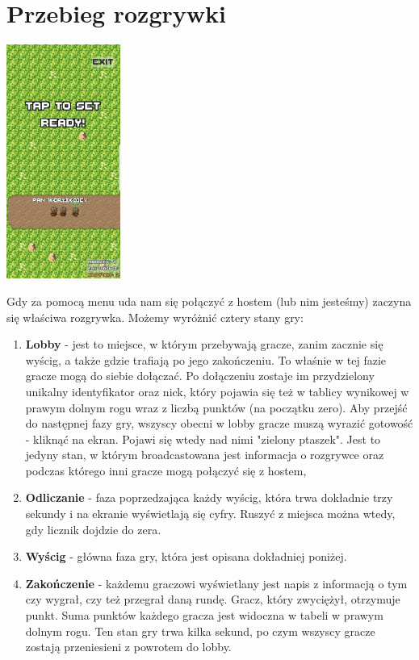 \documentclass[]{report}
\begin{document}
\chapter*{Przebieg rozgrywki}
\begin{center}
	\includegraphics[width=0.28\textwidth]{g3.jpg}
\end{center}
\bigskip
\quad Gdy za pomocą menu uda nam się połączyć z hostem (lub nim jesteśmy) zaczyna się właściwa rozgrywka. Możemy wyróżnić cztery stany gry:
\begin{enumerate}
	\item \textbf{Lobby} - jest to miejsce, w którym przebywają gracze, zanim zacznie się wyścig, a także gdzie trafiają po jego zakończeniu. To właśnie w tej fazie gracze mogą do siebie dołączać. Po dołączeniu zostaje im przydzielony unikalny identyfikator oraz nick, który pojawia się też w tablicy wynikowej w prawym dolnym rogu wraz z liczbą punktów (na początku zero). Aby przejść do następnej fazy gry, wszyscy obecni w lobby gracze muszą wyrazić gotowość - kliknąć na ekran. Pojawi się wtedy nad nimi "zielony ptaszek". Jest to jedyny stan, w którym broadcastowana jest informacja o rozgrywce oraz podczas którego inni gracze mogą połączyć się z hostem,
	\item \textbf{Odliczanie} - faza poprzedzająca każdy wyścig, która trwa dokładnie trzy sekundy i na ekranie wyświetlają się cyfry. Ruszyć z miejsca można wtedy, gdy licznik dojdzie do zera.
	\item \textbf{Wyścig} - główna faza gry, która jest opisana dokładniej poniżej.
	\item \textbf{Zakończenie} - każdemu graczowi wyświetlany jest napis z informacją o tym czy wygrał, czy też przegrał daną rundę. Gracz, który zwyciężył, otrzymuje punkt. Suma punktów każdego gracza jest widoczna w tabeli w prawym dolnym rogu. Ten stan gry trwa kilka sekund, po czym wszyscy gracze zostają przeniesieni z powrotem do lobby.
\end{enumerate}
\end{document}
